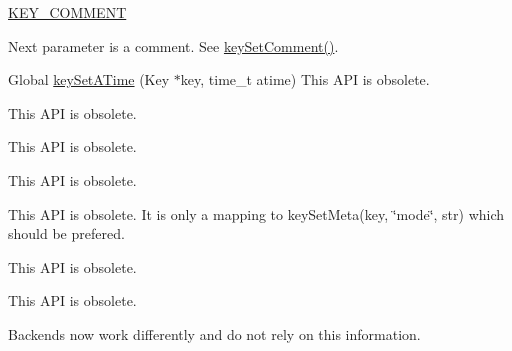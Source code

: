 \begin{DoxyRefList}
\begin{DoxyItemize}
\item \hyperlink{group__key_gga91fb3178848bd682000958089abbaf40ac29427bb47cc31689d02912e36161ee3}{K\-E\-Y\-\_\-\-C\-O\-M\-M\-E\-N\-T} \par
 Next parameter is a comment. See \hyperlink{group__meta_ga8863a877a84fa46e6017fe72e49b89c1}{key\-Set\-Comment()}. 
\begin{DoxyCodeInclude}
\end{DoxyCodeInclude}
Global \hyperlink{group__meta_ga995d8b84731673c88c7c01f3fed538b9}{key\-Set\-A\-Time} (Key $\ast$key, time\-\_\-t atime) This A\-P\-I is obsolete. 
\end{DoxyItemize}
\item[\label{deprecated__deprecated000023}%
\hypertarget{deprecated__deprecated000023}{}%
Global \hyperlink{group__meta_ga9f502ecab8ab43f0b17220fcc95f3fa5}{key\-Set\-C\-Time} (Key $\ast$key, time\-\_\-t ctime)]This A\-P\-I is obsolete. 
\item[\label{deprecated__deprecated000015}%
\hypertarget{deprecated__deprecated000015}{}%
Global \hyperlink{group__meta_gaae575bd86a628a15ee45baa860522e75}{key\-Set\-Dir} (Key $\ast$key)]This A\-P\-I is obsolete. 
\item[\label{deprecated__deprecated000014}%
\hypertarget{deprecated__deprecated000014}{}%
Global \hyperlink{group__meta_ga9e3d0fb3f7ba906e067727b9155d22e3}{key\-Set\-G\-I\-D} (Key $\ast$key, gid\-\_\-t gid)]This A\-P\-I is obsolete. 
\item[\label{deprecated__deprecated000017}%
\hypertarget{deprecated__deprecated000017}{}%
Global \hyperlink{group__meta_ga8803037e35b9da1ce492323a88ff6bc3}{key\-Set\-Mode} (Key $\ast$key, mode\-\_\-t mode)]This A\-P\-I is obsolete. It is only a mapping to key\-Set\-Meta(key, \char`\"{}mode\char`\"{}, str) which should be prefered. 
\item[\label{deprecated__deprecated000021}%
\hypertarget{deprecated__deprecated000021}{}%
Global \hyperlink{group__meta_ga481d8997187992fe4bbf288bc8ef4db7}{key\-Set\-M\-Time} (Key $\ast$key, time\-\_\-t mtime)]This A\-P\-I is obsolete. 
\item[\label{deprecated__deprecated000012}%
\hypertarget{deprecated__deprecated000012}{}%
Global \hyperlink{group__meta_gab5f284f5ecd261e0a290095f50ba1af7}{key\-Set\-U\-I\-D} (Key $\ast$key, uid\-\_\-t uid)]This A\-P\-I is obsolete. 
\item[\label{deprecated__deprecated000009}%
\hypertarget{deprecated__deprecated000009}{}%
Global \hyperlink{group__keyset_ga8f210432e664d8ba06d7d55a2aba2d0f}{ks\-Need\-Sync} (const Key\-Set $\ast$ks)]Backends now work differently and do not rely on this information.
\end{DoxyRefList}